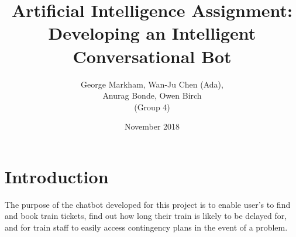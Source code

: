 \documentclass[12pt,a4paper]{article}
\title{Artificial Intelligence Assignment: Developing an Intelligent Conversational Bot}
\author{George Markham, Wan-Ju Chen (Ada), \\ Anurag Bonde, Owen Birch \\ (Group 4)} %
\date{November 2018}
\begin{document}
    \maketitle
    \section*{Introduction}
    The purpose of the chatbot developed for this project is to enable user's to find and book train tickets, find out how long their train is likely to be delayed for, and for train staff to easily access contingency plans in the event of a problem.
    
\end{document}
